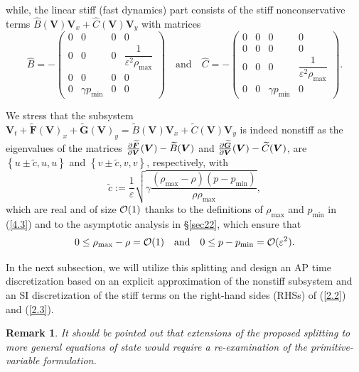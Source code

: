 \documentclass[preprint,12pt]{elsarticle}
\newtheorem{remark}{Remark}[section]
\newcommand{\mF}{\bm{F}}
\newcommand{\mG}{\bm{G}}
\newcommand{\ve}{\varepsilon}
\newcommand\eref[1]{(\ref{#1})}
\newcommand{\uvec}[2][3]{\boldsymbol{#2\mkern-#1mu}\mkern#1mu}
\begin{document}
while, the linear stiff (fast dynamics) part consists of the stiff nonconservative terms 
$\widehat B(\bm V)\bm V_x+\widehat C(\bm V)\bm V_y$
with matrices
\begin{equation*}
	\widehat B=-\begin{pmatrix}0&0&0&0\\0&0&0&\dfrac{1}{\ve^2\rho_{\max}}\\0&0&0&0\\0&\gamma p_{\min}&0&0\end{pmatrix}
	\quad\mbox{and}\quad
	\widehat C=-\begin{pmatrix}0&0&0&0\\0&0&0&0\\0&0&0&\dfrac{1}{\ve^2\rho_{\max}}\\0&0&\gamma p_{\min}&0\end{pmatrix}.
\end{equation*}

We stress that the subsystem
$\bm V_t+\widetilde{\mF}(\bm V)_x+\widetilde{\mG}(\bm V)_y=\widetilde B(\bm V)\bm V_x+\widetilde C(\bm V)\bm V_y$ is indeed nonstiff as the
eigenvalues of the matrices
$\frac{\partial\widetilde{\mF}}{\partial\bm V}(\uvec{V})-\widetilde B(\bm V)$ and
$\frac{\partial\widetilde{\mG}}{\partial\bm V}(\uvec{V})-\widetilde C(\bm V)$, are $\left\{u\pm\tilde c,u,u\right\}$ and
$\left\{v\pm\tilde c,v,v\right\}$, respectively, with 
\begin{equation}
	\tilde c:=\frac{1}{\ve}\sqrt{\gamma\frac{(\rho_{\max}-\rho)(p-p_{\min})}{\rho\rho_{\max}}},
	\label{4.48f}
\end{equation}
which are real and of size ${\cal O}(1)$ thanks to the definitions of $\rho_{\max}$ and $p_{\min}$ in \eref{4.3} and to the asymptotic
analysis in \S\ref{sec22}, which ensure that
\begin{equation}
	0\le\rho_{\max}-\rho={\cal O}(1)\quad\mbox{and}\quad0\le p-p_{\min}={\cal O}(\ve^2).
	\label{4.7}
\end{equation}

In the next subsection, we will utilize this splitting and design an AP time discretization based on an explicit approximation of the
nonstiff subsystem and an SI discretization of the stiff terms on the right-hand sides (RHSs) of \eref{2.2} and \eref{2.3}.
{\color{black}
	\begin{remark}
		It should be pointed out that extensions of the proposed splitting to more general equations of state would require a re-examination of the
		primitive-variable formulation.
\end{remark}}
\end{document}
